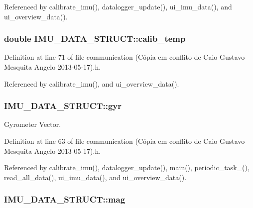 Referenced by calibrate\-\_\-imu(), datalogger\-\_\-update(), ui\-\_\-imu\-\_\-data(), and ui\-\_\-overview\-\_\-data().

\hypertarget{structIMU__DATA__STRUCT_a3553fcee6beba17fe0c7711ac0483875}{
\subsubsection[{calib\-\_\-temp}]{\setlength{\rightskip}{0pt plus 5cm}double I\-M\-U\-\_\-\-D\-A\-T\-A\-\_\-\-S\-T\-R\-U\-C\-T\-::calib\-\_\-temp}}\label{structIMU__DATA__STRUCT_a3553fcee6beba17fe0c7711ac0483875}


Definition at line 71 of file communication (\-Cópia em conflito de Caio Gustavo Mesquita Angelo 2013-\/05-\/17).\-h.



Referenced by calibrate\-\_\-imu(), and ui\-\_\-overview\-\_\-data().

\hypertarget{structIMU__DATA__STRUCT_a0c1ac26626e4434a2ee124a1928a23a1}{
\subsubsection[{gyr}]{ I\-M\-U\-\_\-\-D\-A\-T\-A\-\_\-\-S\-T\-R\-U\-C\-T\-::gyr}}\label{structIMU__DATA__STRUCT_a0c1ac26626e4434a2ee124a1928a23a1}


Gyrometer Vector. 



Definition at line 63 of file communication (\-Cópia em conflito de Caio Gustavo Mesquita Angelo 2013-\/05-\/17).\-h.



Referenced by calibrate\-\_\-imu(), datalogger\-\_\-update(), main(), periodic\-\_\-task\-\_(), read\-\_\-all\-\_\-data(), ui\-\_\-imu\-\_\-data(), and ui\-\_\-overview\-\_\-data().

\hypertarget{structIMU__DATA__STRUCT_a40c7df8b6d49297aa52873cfd9b60daa}{
\subsubsection[{mag}]{ I\-M\-U\-\_\-\-D\-A\-T\-A\-\_\-\-S\-T\-R\-U\-C\-T\-::mag}}\label{structIMU__DATA__STRUCT_a40c7df8b6d49297aa52873cfd9b60daa}


